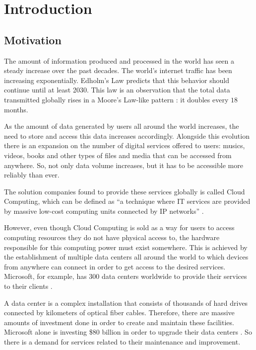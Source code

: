 \chapter{Introduction}\label{chap:introduction}

\section{Motivation}\label{sec:motivation}

The amount of information produced and processed in the world has seen a steady increase over the past decades.
The world's internet traffic has been increasing exponentially.
Edholm's Law \cite{Edholm04} predicts that this behavior should continue until at least 2030.
This law is an observation that the total data transmitted globally rises in a Moore's Law-like pattern \cite{Moore98}: it doubles every $18$ months.

As the amount of data generated by users all around the world increases, the need to store and access this data increases accordingly.
Alongside this evolution there is an expansion on the number of digital services offered to users: musics, videos, books and other types of files and media that can be accessed from anywhere.
So, not only data volume increases, but it has to be accessible more reliably than ever.

The solution companies found to provide these services globally is called Cloud Computing, which can be defined as ``a technique where IT services are provided by massive low-cost computing units connected by IP networks'' \cite{Qian09}.

However, even though Cloud Computing is sold as a way for users to access computing resources they do not have physical access to, the hardware responsible for this computing power must exist somewhere.
This is achieved by the establishment of multiple data centers all around the world to which devices from anywhere can connect in order to get access to the desired services.
Microsoft, for example, has 300 data centers worldwide to provide their services to their clients \cite{MicrosoftDataCenters}.

A data center is a complex installation that consists of thousands of hard drives connected by kilometers of optical fiber cables.
Therefore, there are massive amounts of investment done in order to create and maintain these facilities.
Microsoft alone is investing \$80 billion in order to upgrade their data centers \cite{MicrosoftDataCenters}.
So there is a demand for services related to their maintenance and improvement.

